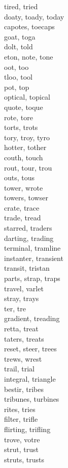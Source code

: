 tired, tried\\
doaty, toady, today\\
capotes, toecaps\\
goat, toga\\
dolt, told\\
eton, note, tone\\
oot, too\\
tloo, tool\\
pot, top\\
optical, topical\\
quote, toque\\
rote, tore\\
torts, trots\\
tory, troy, tyro\\
hotter, tother\\
couth, touch\\
rout, tour, trou\\
outs, tous\\
tower, wrote\\
towers, towser\\
crate, trace\\
trade, tread\\
starred, traders\\
darting, trading\\
terminal, tramline\\
instanter, transient\\
transit, tristan\\
parts, strap, traps\\
travel, varlet\\
stray, trays\\
ter, tre\\
gradient, treading\\
retta, treat\\
taters, treats\\
reset, steer, trees\\
trews, wrest\\
trail, trial\\
integral, triangle\\
bestir, tribes\\
tribunes, turbines\\
rites, tries\\
filter, trifle\\
flirting, trifling\\
trove, votre\\
strut, trust\\
struts, trusts\\
